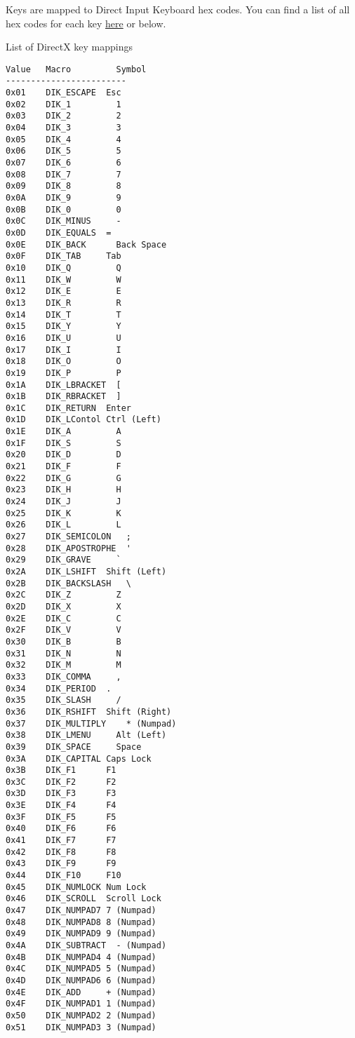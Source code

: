 \documentclass[
  openany]{book}
\begin{document}
Keys are mapped to Direct Input Keyboard hex codes. You can find a list of all hex codes for each key \href{http://www.flint.jp/misc/?q=dik\&lang=en}{here} or below.

List of DirectX key mappings

\begin{verbatim}
Value   Macro         Symbol
------------------------
0x01    DIK_ESCAPE  Esc 
0x02    DIK_1         1 
0x03    DIK_2         2 
0x04    DIK_3         3 
0x05    DIK_4         4 
0x06    DIK_5         5 
0x07    DIK_6         6 
0x08    DIK_7         7 
0x09    DIK_8         8 
0x0A    DIK_9         9 
0x0B    DIK_0         0 
0x0C    DIK_MINUS     - 
0x0D    DIK_EQUALS  =   
0x0E    DIK_BACK      Back Space    
0x0F    DIK_TAB     Tab 
0x10    DIK_Q         Q 
0x11    DIK_W         W 
0x12    DIK_E         E 
0x13    DIK_R         R 
0x14    DIK_T         T 
0x15    DIK_Y         Y 
0x16    DIK_U         U 
0x17    DIK_I         I 
0x18    DIK_O         O 
0x19    DIK_P         P 
0x1A    DIK_LBRACKET  [ 
0x1B    DIK_RBRACKET  ] 
0x1C    DIK_RETURN  Enter   
0x1D    DIK_LContol Ctrl (Left) 
0x1E    DIK_A         A 
0x1F    DIK_S         S 
0x20    DIK_D         D 
0x21    DIK_F         F 
0x22    DIK_G         G 
0x23    DIK_H         H 
0x24    DIK_J         J 
0x25    DIK_K         K 
0x26    DIK_L         L 
0x27    DIK_SEMICOLON   ;   
0x28    DIK_APOSTROPHE  '   
0x29    DIK_GRAVE     ` 
0x2A    DIK_LSHIFT  Shift (Left)    
0x2B    DIK_BACKSLASH   \   
0x2C    DIK_Z         Z 
0x2D    DIK_X         X 
0x2E    DIK_C         C 
0x2F    DIK_V         V 
0x30    DIK_B         B 
0x31    DIK_N         N 
0x32    DIK_M         M 
0x33    DIK_COMMA     , 
0x34    DIK_PERIOD  .   
0x35    DIK_SLASH     / 
0x36    DIK_RSHIFT  Shift (Right)   
0x37    DIK_MULTIPLY    * (Numpad)  
0x38    DIK_LMENU     Alt (Left)    
0x39    DIK_SPACE     Space 
0x3A    DIK_CAPITAL Caps Lock
0x3B    DIK_F1      F1  
0x3C    DIK_F2      F2  
0x3D    DIK_F3      F3  
0x3E    DIK_F4      F4  
0x3F    DIK_F5      F5  
0x40    DIK_F6      F6  
0x41    DIK_F7      F7  
0x42    DIK_F8      F8  
0x43    DIK_F9      F9  
0x44    DIK_F10     F10 
0x45    DIK_NUMLOCK Num Lock    
0x46    DIK_SCROLL  Scroll Lock 
0x47    DIK_NUMPAD7 7 (Numpad)  
0x48    DIK_NUMPAD8 8 (Numpad)  
0x49    DIK_NUMPAD9 9 (Numpad)  
0x4A    DIK_SUBTRACT  - (Numpad)    
0x4B    DIK_NUMPAD4 4 (Numpad)  
0x4C    DIK_NUMPAD5 5 (Numpad)  
0x4D    DIK_NUMPAD6 6 (Numpad)  
0x4E    DIK_ADD     + (Numpad)  
0x4F    DIK_NUMPAD1 1 (Numpad)  
0x50    DIK_NUMPAD2 2 (Numpad)  
0x51    DIK_NUMPAD3 3 (Numpad)  

\end{verbatim}
\end{document}
